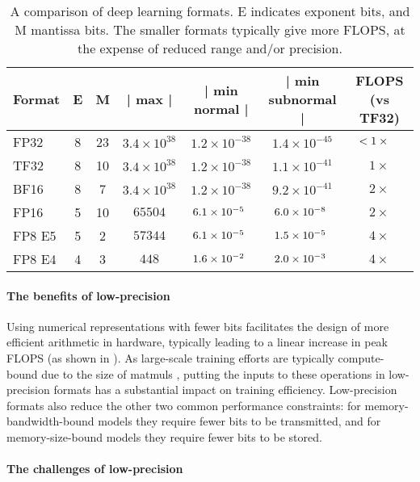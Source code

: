 \begin{table*}[ht]
  \centering
  \caption{A comparison of deep learning formats. E indicates exponent bits, and M mantissa bits. The smaller formats typically give more FLOPS, at the expense of reduced range and/or precision.}
  \label{table:formats}
  \begin{tabular}{lcccccc}
      \toprule
      Format & E & M & | max | & | min normal | & | min subnormal | & FLOPS (vs TF32)
      \\
      \midrule
      FP32 & 8 & 23 & $3.4 \times 10^{38}$ & $1.2 \times 10^{-38}$ & $1.4 \times 10^{-45}$ & $< 1 \times \hphantom{<}$
      \\
      TF32 & 8 & 10 & $3.4 \times 10^{38}$ & $1.2 \times 10^{-38}$ & $1.1 \times 10^{-41}$ & $1 \times$
      \\
      BF16 & 8 & 7 & $3.4 \times 10^{38}$ & $1.2 \times 10^{-38}$ & $9.2 \times 10^{-41}$ & $2 \times$
      \\
      FP16 & 5 & 10 & $65504$ & $6.1 \times 10^{-5\hphantom{0}}$ & $6.0 \times 10^{-8\hphantom{0}}$ & $2 \times$
      \\
      FP8 E5 & 5 & 2 & $57344$ & $6.1 \times 10^{-5\hphantom{0}}$ & $1.5 \times 10^{-5\hphantom{0}}$ & $4 \times$
      \\
      FP8 E4 & 4 & 3 & $448$ & $1.6 \times 10^{-2\hphantom{0}}$ & $2.0 \times 10^{-3\hphantom{0}}$ & $4 \times$
      \\
      \bottomrule
  \end{tabular}
\end{table*}

\paragraph{The benefits of low-precision}

Using numerical representations with fewer bits facilitates the design of more efficient arithmetic in hardware, typically leading to a linear increase in peak FLOPS (as shown in ). As large-scale training efforts are typically compute-bound due to the size of matmuls \citep{Megatron-LM_Cluster}, putting the inputs to these operations in low-precision formats has a substantial impact on training efficiency. Low-precision formats also reduce the other two common performance constraints: for memory-bandwidth-bound models they require fewer bits to be transmitted, and for memory-size-bound models they require fewer bits to be stored.

\paragraph{The challenges of low-precision}

